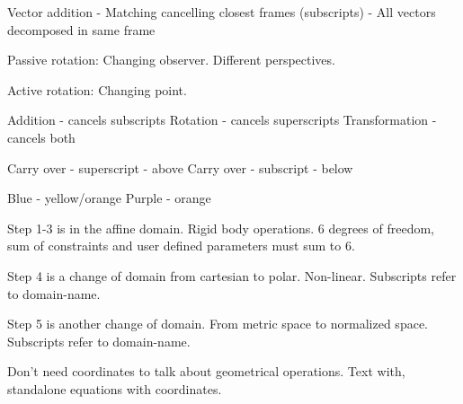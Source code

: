 
\makeatletter
\let\@seccntformat\@oldseccntformat
\let\subsubsection\oldsubsubsection
\makeatother

Vector addition
- Matching cancelling closest frames (subscripts)
- All vectors decomposed in same frame

Passive rotation:
Changing observer. Different perspectives. 

Active rotation:
Changing point.


Addition - cancels subscripts
Rotation - cancels superscripts
Transformation - cancels both

Carry over - superscript - above
Carry over - subscript - below

Blue - yellow/orange
Purple - orange

Step 1-3 is in the affine domain. Rigid body operations. 6 degrees of freedom, sum of constraints and user defined parameters must sum to 6.

Step 4 is a change of domain from cartesian to polar. Non-linear. Subscripts refer to domain-name.

Step 5 is another change of domain. From metric space to normalized space. Subscripts refer to domain-name.

Don't need coordinates to talk about geometrical operations. Text with, standalone equations with coordinates.

